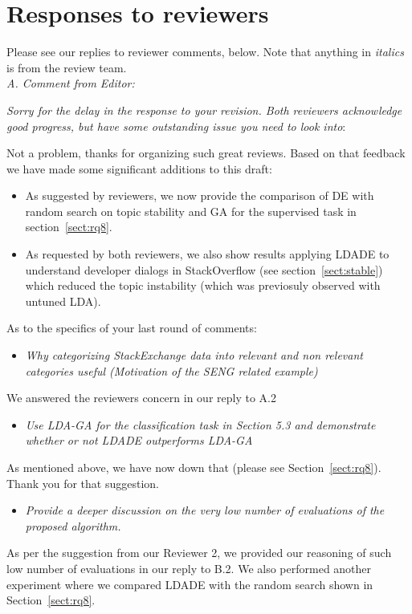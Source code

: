 \documentclass[twocolumn,5p,sort&compress]{elsarticle}
\newcommand{\bi}{\begin{itemize}}
\newcommand{\ei}{\end{itemize}}
\theoremstyle{break}
\begin{document}
\clearpage
{}
\setcounter{page}{1}

\nobalance
\pagestyle{plain} 

\section*{Responses to reviewers}

Please see our replies to reviewer comments, below. Note that anything in {\em italics} is from the review team.\\

\noindent
\textit{A. Comment from Editor:}

{\em Sorry for the delay in the response to your revision. Both reviewers acknowledge good progress, but have some outstanding issue you need to look into}:

Not a  problem, thanks for organizing such great reviews. Based on that feedback we have made some significant
additions to this draft:
\bi
\item As suggested by reviewers, we now provide the comparison of DE with random search on topic stability and GA for the supervised task in section~\ref{sect:rq8}. 
\item As requested by both reviewers,   we also show
results applying LDADE to understand developer dialogs in StackOverflow (see section~\ref{sect:stable}) which reduced the topic instability (which was previosuly observed with untuned LDA).
\ei
As to the specifics of your last round of comments:\\

\bi
\item {\em Why categorizing StackExchange data into relevant and non relevant categories useful (Motivation of the SENG related example)\\}
\ei
We answered the reviewers concern in our reply to A.2\\

\bi
\item {\em Use LDA-GA for the classification task in Section 5.3 and demonstrate whether or not LDADE outperforms LDA-GA\\}
\ei
As mentioned above, we have
now down that   (please see Section~\ref{sect:rq8}). Thank you for that suggestion.\\

\bi
\item {\em Provide a deeper discussion on the very low number of evaluations of the proposed algorithm.\\}
\ei
As per the suggestion from our Reviewer 2, we provided our reasoning of such low number of evaluations in our reply to B.2. We also performed another experiment where we compared LDADE with the random search shown in Section~\ref{sect:rq8}.\\
\end{document}
